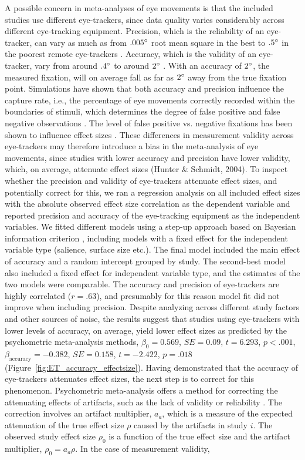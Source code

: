\documentclass[english,natbib,man,floatsintext]{apa6}
\newcommand{\SE}{\mathit{SE}}
\begin{document}
A possible concern in meta-analyses of eye movements is that the included studies use different eye-trackers, since data quality varies considerably across different eye-tracking equipment. Precision, which is the reliability of an eye-tracker, can vary as much as from $.005\degree$ root mean square in the best to $.5\degree$ in the poorest remote eye-trackers \citep{holmqvist2015a}. Accuracy, which is the validity of an eye-tracker, vary from around $.4\degree$ to around $2\degree$ \citep{holmqvist2015a}. With an accuracy of $2\degree$, the measured fixation, will on average fall as far as $2\degree$ away from the true fixation point. Simulations have shown that both accuracy and precision influence the capture rate, i.e., the percentage of eye movements correctly recorded within the boundaries of stimuli, which determines the degree of false positive and false negative observations \citep{orquin2019a}. The level of false positive vs. negative fixations has been shown to influence effect sizes \citep{orquin2016a}. These differences in measurement validity across eye-trackers may therefore introduce a bias in the meta-analysis of eye movements, since studies with lower accuracy and precision have lower validity, which, on average, attenuate effect sizes (Hunter \& Schmidt, 2004). To inspect whether the precision and validity of eye-trackers attenuate effect sizes, and potentially correct for this, we ran a regression analysis on all included effect sizes with the absolute observed effect size correlation as the dependent variable and reported precision and accuracy of the eye-tracking equipment as the independent variables. We fitted different models using a step-up approach \citep{ryoo2011model} based on Bayesian information criterion \citep{Schwarz1978}, including models with a fixed effect for the independent variable type (salience, surface size etc.). The final model included the main effect of accuracy and a random intercept grouped by study. The second-best model also included a fixed effect for independent variable type, and the estimates of the two models were comparable. The accuracy and precision of eye-trackers are highly correlated ($r = .63$), and presumably for this reason model fit did not improve when including precision. Despite analyzing across different study factors and other sources of noise, the results suggest that studies using eye-trackers with lower levels of accuracy, on average, yield lower effect sizes as predicted by the psychometric meta-analysis methods, $\beta_0 = 0.569$, $\SE = 0.09$, $t = 6.293$, $p < .001$, $\beta_{\textrm{accuracy}} = -0.382$, $\SE = 0.158$, $t = -2.422$, $p = .018$ (Figure~\ref{fig:ET_accuracy_effectsize}). Having demonstrated that the accuracy of eye-trackers attenuates effect sizes, the next step is to correct for this phenomenon. Psychometric meta-analysis offers a method for correcting the attenuating effects of artifacts, such as the lack of validity or reliability \citep{hunter2004a}. The correction involves an artifact multiplier, $a_a$, which is a measure of the expected attenuation of the true effect size $\rho$ caused by the artifacts in study $i$. The observed study effect size $\rho_0$ is a function of the true effect size and the artifact multiplier, $\rho_0 = a_a \rho$. In the case of measurement validity, 
\end{document}
